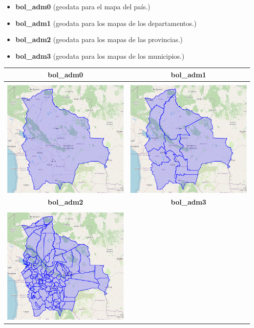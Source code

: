 \documentclass[12pt]{article}
\begin{document}
\begin{itemize}
\item \textbf{bol\_adm0} (geodata para el mapa del país.)
\item \textbf{bol\_adm1} (geodata para los mapas de los departamentos.)
\item \textbf{bol\_adm2} (geodata para los mapas de las provincias.)
\item \textbf{bol\_adm3} (geodata para los mapas de los municipios.)
\end{itemize}

\begin{center}
\begin{tabular}{c c}
	\hline\hline 
	\textbf{bol\_adm0} & \textbf{bol\_adm1}
	\\
	\hline & \\[-1.5ex]
  	\includegraphics[width=8cm]{adm0}
	&
  	\includegraphics[width=8cm]{adm1}
	\\ [0.5ex]
	\hline\hline
		\textbf{bol\_adm2} & \textbf{bol\_adm3}
	\\
	\hline & \\[-1.5ex]
  	\includegraphics[width=8cm]{adm2}

\end{tabular}
\end{center}
\end{document}
